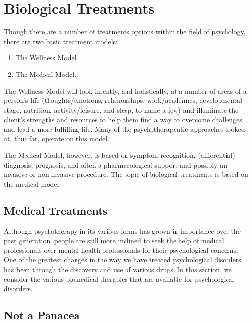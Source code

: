 \documentclass[
]{book}
\providecommand{\tightlist}{%
  \setlength{\itemsep}{0pt}\setlength{\parskip}{0pt}}
\begin{document}
\hypertarget{biological-treatments}{%
\section{Biological Treatments}\label{biological-treatments}}

Though there are a number of treatments options within the field of psychology, there are two basic treatment models:

\begin{enumerate}
\def\labelenumi{\arabic{enumi}.}
\tightlist
\item
  The Wellness Model\\
\item
  The Medical Model.
\end{enumerate}

The Wellness Model will look intently, and holistically, at a number of areas of a person's life (thoughts/emotions, relationships, work/academics, developmental stage, nutrition, activity/leisure, and sleep, to name a few) and illuminate the client's strengths and resources to help them find a way to overcome challenges and lead a more fulfilling life. Many of the psychotherapeutic approaches looked at, thus far, operate on this model.

The Medical Model, however, is based on symptom recognition, (differential) diagnosis, prognosis, and often a pharmacological support and possibly an invasive or non-invasive procedure. The topic of biological treatments is based on the medical model.

\hypertarget{medical-treatments}{%
\subsection*{Medical Treatments}\label{medical-treatments}}

Although psychotherapy in its various forms has grown in importance over the past generation, people are still more inclined to seek the help of medical professionals over mental health professionals for their psychological concerns. One of the greatest changes in the way we have treated psychological disorders has been through the discovery and use of various drugs. In this section, we consider the various biomedical therapies that are available for psychological disorders.

\hypertarget{not-a-panacea}{%
\subsection*{Not a Panacea}\label{not-a-panacea}}
\end{document}

